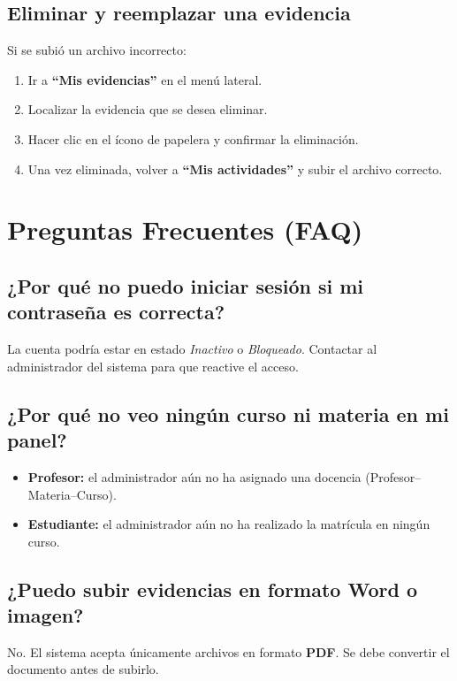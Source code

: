 \documentclass[12pt, a4paper]{article}
\begin{document}
\subsection{Eliminar y reemplazar una evidencia}

Si se subió un archivo incorrecto:

\begin{enumerate}
    \item Ir a \textbf{``Mis evidencias''} en el menú lateral.
    \item Localizar la evidencia que se desea eliminar.
    \item Hacer clic en el ícono de papelera y confirmar la eliminación.
    \item Una vez eliminada, volver a \textbf{``Mis actividades''} y subir el archivo correcto.
\end{enumerate}

\section{Preguntas Frecuentes (FAQ)}

\subsection*{¿Por qué no puedo iniciar sesión si mi contraseña es correcta?}
La cuenta podría estar en estado \textit{Inactivo} o \textit{Bloqueado}. Contactar al administrador del sistema para que reactive el acceso.

\subsection*{¿Por qué no veo ningún curso ni materia en mi panel?}
\begin{itemize}
    \item \textbf{Profesor:} el administrador aún no ha asignado una docencia (Profesor--Materia--Curso).
    \item \textbf{Estudiante:} el administrador aún no ha realizado la matrícula en ningún curso.
\end{itemize}

\subsection*{¿Puedo subir evidencias en formato Word o imagen?}
No. El sistema acepta únicamente archivos en formato \textbf{PDF}. Se debe convertir el documento antes de subirlo.
\end{document}

